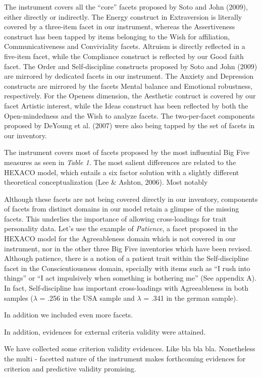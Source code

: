 \documentclass[,man]{apa6}
\theoremstyle{definition}
\theoremstyle{definition}
\theoremstyle{definition}
\theoremstyle{remark}
\begin{document}
The instrument covers all the \enquote{core} facets proposed by Soto and
John (2009), either directly or indirectly. The Energy construct in
Extraversion is literally covered by a three-item facet in our
instrument, whereas the Assertiveness construct has been tapped by items
belonging to the Wish for affiliation, Communicativeness and
Conviviality facets. Altruism is directly reflected in a five-item
facet, while the Compliance construct is reflected by our Good faith
facet. The Order and Self-discipline constructs proposed by Soto and
John (2009) are mirrored by dedicated facets in our instrument. The
Anxiety and Depression constructs are mirrored by the facets Mental
balance and Emotional robustness, respectively. For the Openess
dimension, the Aesthetic contruct is covered by our facet Artistic
interest, while the Ideas construct has been reflected by both the
Open-mindedness and the Wish to analyze facets. The two-per-facet
components proposed by DeYoung et al. (2007) were also being tapped by
the set of facets in our inventory.

The instrument covers most of facets proposed by the most influential
Big Five measures as seen in \emph{Table 1}. The most salient
differences are related to the HEXACO model, which entails a six factor
solution with a slightly different theoretical conceptualization (Lee \&
Ashton, 2006). Most notably

Although these facets are not being covered directly in our inventory,
components of facets from distinct domains in our model retain a glimpse
of the missing facets. This underlies the importance of allowing
cross-loadings for trait personality data. Let's use the example of
\emph{Patience}, a facet proposed in the HEXACO model for the
Agreeableness domain which is not covered in our instrument, nor in the
other three Big Five inventories which have been revised. Although
patience, there is a notion of a patient trait within the
Self-discipline facet in the Conscientiousness domain, specially with
items such as \enquote{I rush into things} or \enquote{I act impulsively
when something is bothering me} (See appendix A). In fact,
Self-discipline has important cross-loadings with Agreeableness in both
samples (\(\lambda\) = .256 in the USA sample and \(\lambda\) = .341 in
the german sample).

In addition we included even more facets.

In addition, evidences for external criteria validity were attained.

We have collected some criterion validity evidences. Like bla bla bla.
Nonetheless the multi - facetted nature of the instrument makes
forthcoming evidences for criterion and predictive validity promising.
\end{document}
